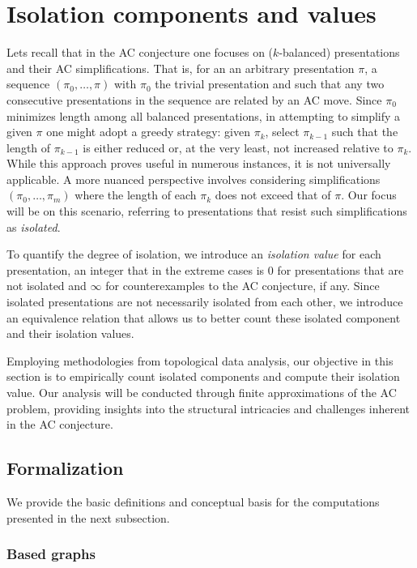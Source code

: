 
\section{Isolation components and values}\label{s:isolation}

Lets recall that in the AC conjecture one focuses on ($k$-balanced) presentations and their AC simplifications.
That is, for an an arbitrary presentation $\pi$, a sequence $(\pi_0,\dots,\pi)$ with $\pi_0$ the trivial presentation and such that any two consecutive presentations in the sequence are related by an AC move.
Since $\pi_0$ minimizes length among all balanced presentations, in attempting to simplify a given $\pi$ one might adopt a greedy strategy: given $\pi_k$, select $\pi_{k-1}$ such that the length of $\pi_{k-1}$ is either reduced or, at the very least, not increased relative to $\pi_k$.
While this approach proves useful in numerous instances, it is not universally applicable.
A more nuanced perspective involves considering simplifications $(\pi_0,\dots,\pi_m)$ where the length of each $\pi_k$ does not exceed that of $\pi$.
Our focus will be on this scenario, referring to presentations that resist such simplifications as \textit{isolated}.

To quantify the degree of isolation, we introduce an \textit{isolation value} for each presentation,
an integer that in the extreme cases is $0$ for presentations that are not isolated and $\infty$ for counterexamples to the AC conjecture, if any.
Since isolated presentations are not necessarily isolated from each other, we introduce an equivalence relation that allows us to better count these isolated component and their isolation values.

Employing methodologies from topological data analysis, our objective in this section is to empirically count isolated components and compute their isolation value.
Our analysis will be conducted through finite approximations of the AC problem, providing insights into the structural intricacies and challenges inherent in the AC conjecture.

\subsection{Formalization}

We provide the basic definitions and conceptual basis for the computations presented in the next subsection.

\subsubsection{Based graphs}

